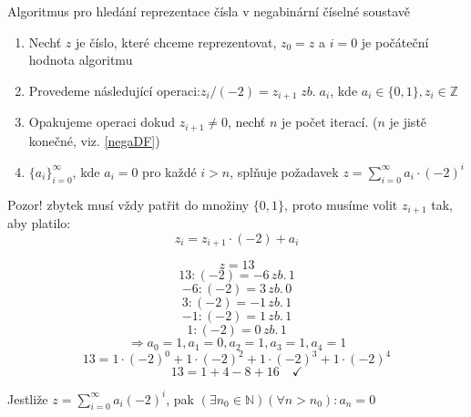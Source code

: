 \documentclass[czech,bachelor,dept470,male]{diploma}
\newcommand{\posla}{\{a_i\}_{i=0}^{\infty}}
\begin{document}
\begin{remark} Algoritmus pro hledání reprezentace čísla v negabinární číselné soustavě\newline
	\begin{enumerate}
		\item Nechť $z$ je číslo, které chceme reprezentovat, $z_0 = z$ a $i=0$ je počáteční hodnota algoritmu
		\item Provedeme následující operaci:\newline $z_i/(-2)=z_{i+1}\;zb.\;a_i$, kde $ a_i\in\{0,1\}, 
		z_i\in\mathbb{Z}$
		\item Opakujeme operaci dokud $z_{i+1}\ne0$, nechť $n$ je počet iterací. ($n$ je jistě konečné, viz. \ref{negaDF})
		\item $\posla$, kde $a_i=0$ pro každé $i>n$, splňuje požadavek $z=
		\sum_{i=0}^{\infty}a_i\cdot(-2)^i$
	\end{enumerate}
	Pozor! zbytek musí vždy patřit do množiny $\{0,1\}$, proto musíme volit $z_{i+1}$ tak, aby platilo: $$z_i=z_{i+1}\cdot(-2)+a_i$$
\end{remark}
\begin{example}
	$$z=13$$
	$$13:(-2)=-6\,zb.\,1$$
	$$-6:(-2)=3\,zb.\,0$$
	$$3:(-2)=-1\,zb.\,1$$
	$$-1:(-2)=1\,zb.\,1$$
	$$1:(-2)=0\,zb.\,1$$
	$$\Rightarrow a_0=1, a_1=0,a_2=1,a_3=1,a_4=1$$
	$$ 13 = 1\cdot(-2)^0 + 1 \cdot(-2)^2+1\cdot(-2)^3+1\cdot(-2)^4$$
	$$ 13 = 1 + 4-8+16\quad \checkmark$$
\end{example}
\begin{theorem}
	Jestliže $z=\sum_{i=0}^{\infty}a_i(-2)^i$, pak $(\exists n_0 \in \mathbb{N})(\forall n>n_0):a_n=0$
\end{theorem}
\end{document}
